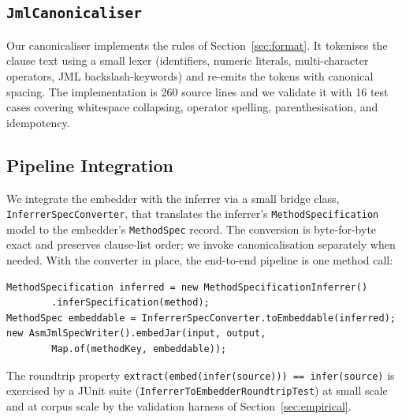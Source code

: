\subsection{\texttt{JmlCanonicaliser}}

Our canonicaliser implements the rules of Section~\ref{sec:format}. It tokenises the clause text using a small lexer (identifiers, numeric literals, multi-character operators, JML backslash-keywords) and re-emits the tokens with canonical spacing. The implementation is 260 source lines and we validate it with 16 test cases covering whitespace collapsing, operator spelling, parenthesisation, and idempotency.

\subsection{Pipeline Integration}

We integrate the embedder with the inferrer via a small bridge class, \texttt{InferrerSpecConverter}, that translates the inferrer's \texttt{MethodSpecification} model to the embedder's \texttt{MethodSpec} record. The conversion is byte-for-byte exact and preserves clause-list order; we invoke canonicalisation separately when needed. With the converter in place, the end-to-end pipeline is one method call:

\begin{lstlisting}
MethodSpecification inferred = new MethodSpecificationInferrer()
        .inferSpecification(method);
MethodSpec embeddable = InferrerSpecConverter.toEmbeddable(inferred);
new AsmJmlSpecWriter().embedJar(input, output,
        Map.of(methodKey, embeddable));
\end{lstlisting}

The roundtrip property
\texttt{extract(embed(\allowbreak{}infer(\allowbreak{}source)))~==~infer(\allowbreak{}source)}
is exercised by a JUnit suite (\texttt{InferrerToEmbedderRoundtripTest}) at small scale and at corpus scale by the validation harness of Section~\ref{sec:empirical}.
